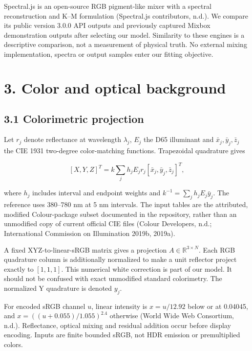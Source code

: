 \documentclass[
  10pt,
  twocolumn]{article}
\begin{document}
Spectral.js is an open-source RGB pigment-like mixer with a spectral
reconstruction and K--M formulation (Spectral.js contributors, n.d.). We
compare its public version 3.0.0 API outputs and previously captured
Mixbox demonstration outputs after selecting our model. Similarity to
these engines is a descriptive comparison, not a measurement of physical
truth. No external mixing implementation, spectra or output samples
enter our fitting objective.

\hypertarget{color-and-optical-background}{%
\section{3. Color and optical
background}\label{color-and-optical-background}}

\hypertarget{colorimetric-projection}{%
\subsection{3.1 Colorimetric projection}\label{colorimetric-projection}}

Let \(r_j\) denote reflectance at wavelength \(\lambda_j\), \(E_j\) the
D65 illuminant and \(\bar{x}_j,\bar{y}_j,\bar{z}_j\) the CIE 1931
two-degree color-matching functions. Trapezoidal quadrature gives

\[[X,Y,Z]^T = k\sum_j h_j E_j r_j[\bar{x}_j,\bar{y}_j,\bar{z}_j]^T,\]

where \(h_j\) includes interval and endpoint weights and
\(k^{-1}=\sum_jh_jE_j\bar{y}_j\). The reference uses 380--780 nm at 5 nm
intervals. The input tables are the attributed, modified Colour-package
subset documented in the repository, rather than an unmodified copy of
current official CIE files (Colour Developers, n.d.; International
Commission on Illumination 2019b, 2019a).

A fixed XYZ-to-linear-sRGB matrix gives a projection
\(A\in\mathbb{R}^{3\times N}\). Each RGB quadrature column is
additionally normalized to make a unit reflector project exactly to
\([1,1,1]\). This numerical white correction is part of our model. It
should not be confused with exact unmodified standard colorimetry. The
normalized Y quadrature is denoted \(y_j\).

For encoded sRGB channel \(u\), linear intensity is \(x=u/12.92\) below
or at 0.04045, and \(x=((u+0.055)/1.055)^{2.4}\) otherwise (World Wide
Web Consortium, n.d.). Reflectance, optical mixing and residual addition
occur before display encoding. Inputs are finite bounded sRGB, not HDR
emission or premultiplied colors.
\end{document}
